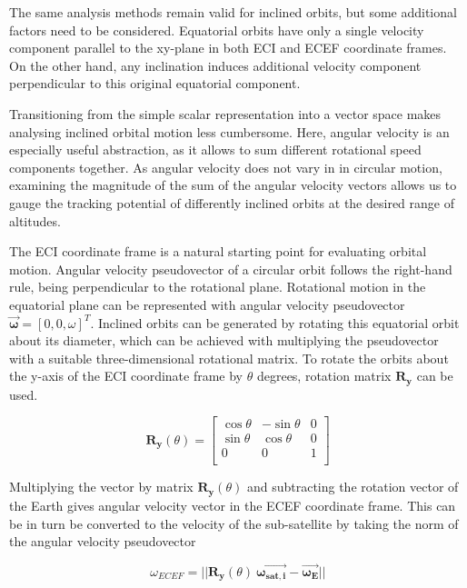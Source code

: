 \documentclass[english, 12pt, a4paper, elec, utf8, a-1b, online]{aaltothesis}
\begin{document}
The same analysis methods remain valid for inclined orbits, but some additional factors need to be considered.
Equatorial orbits have only a single velocity component parallel to the xy-plane in both ECI and ECEF coordinate frames.
On the other hand, any inclination induces additional velocity component perpendicular to this original equatorial component.

Transitioning from the simple scalar representation into a vector space makes analysing inclined orbital motion less cumbersome.
Here, angular velocity is an especially useful abstraction, as it allows to sum different rotational speed components together.
As angular velocity does not vary in in circular motion, examining the magnitude of the sum of the angular velocity vectors allows us to gauge the tracking potential of differently inclined orbits at the desired range of altitudes.

The ECI coordinate frame is a natural starting point for evaluating orbital motion.
Angular velocity pseudovector of a circular orbit follows the right-hand rule, being perpendicular to the rotational plane.
Rotational motion in the equatorial plane can be represented with angular velocity pseudovector $\bm{\vec{\omega}} = [0,0,\omega]^T$.
Inclined orbits can be generated by rotating this equatorial orbit about its diameter, which can be achieved with multiplying the pseudovector with a suitable three-dimensional rotational matrix.
To rotate the orbits about the y-axis of the ECI coordinate frame by $\theta$ degrees, rotation matrix $\bm{R_y}$ can be used.

\begin{equation*}
  \bm{R_y}(\theta) = \begin{bmatrix}
    \cos \theta & -\sin \theta & 0 \\[3pt]
    \sin \theta &  \cos \theta & 0 \\[3pt]
    0           &  0           & 1 \\
    \end{bmatrix}
\end{equation*}

Multiplying the vector by matrix $\bm{R_y}(\theta)$ and subtracting the rotation vector of the Earth gives angular velocity vector in the ECEF coordinate frame.
This can be in turn be converted to the velocity of the sub-satellite by taking the norm of the angular velocity pseudovector

\begin{equation*}
  \omega_{ECEF} =
  ||\bm{R_y}(\theta)\ \bm{\vec{\omega_{sat, i}}} - \bm{\vec{\omega_{E}}}||
\end{equation*}
\end{document}
